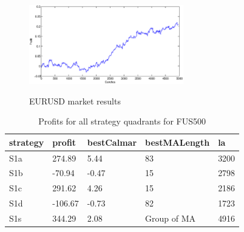 \documentclass{tewiart}
\begin{document}
\begin{figure}[h]
\begin{minipage}{.49\linewidth}
\label{mansard}
\end{minipage}
\begin{minipage}{\linewidth}
\centering 
\includegraphics[width=0.6\textwidth]{images/S1s_eurusd.eps}
\label{mansard}
\end{minipage}
\caption{EURUSD market results}
\end{figure}
\FloatBarrier




\newpage
\begin{table}[!t]
\caption{Profits for all strategy quadrants for FUS500} 
 \begin{center} 
 \begin{tabular}{|l|l|l|l|l|} 
 \hline \textbf{strategy} & \textbf{profit} & \textbf{bestCalmar} & \textbf{bestMALength} & \textbf{la} \\ \hline  
S1a & 274.89 & 5.44 & 83 & 3200\\ \hline 
S1b & -70.94 & -0.47 & 15 & 2798\\ \hline 
S1c & 291.62 & 4.26 & 15 & 2186\\ \hline 
S1d & -106.67 & -0.73 & 82 & 1723\\ \hline 
S1s & 344.29 & 2.08 & Group of MA & 4916\\ 
\hline \end{tabular} 
 \end{center} 
 \end{table}
\FloatBarrier
\end{document}
